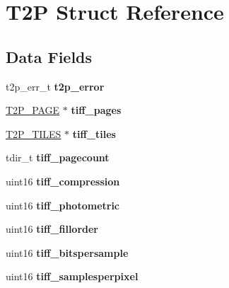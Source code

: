 \hypertarget{struct_t2_p}{}\section{T2\+P Struct Reference}
\label{struct_t2_p}
\subsection*{Data Fields}
\begin{DoxyCompactItemize}
\item 
\hypertarget{struct_t2_p_a9d83353cd1d690dc4c049bda3d47fb19}{}t2p\+\_\+err\+\_\+t {\bfseries t2p\+\_\+error}\label{struct_t2_p_a9d83353cd1d690dc4c049bda3d47fb19}

\item 
\hypertarget{struct_t2_p_adb01b3aa1ab13aca242d6f984a8a8e6f}{}\hyperlink{struct_t2_p___p_a_g_e}{T2\+P\+\_\+\+P\+A\+G\+E} $\ast$ {\bfseries tiff\+\_\+pages}\label{struct_t2_p_adb01b3aa1ab13aca242d6f984a8a8e6f}

\item 
\hypertarget{struct_t2_p_a65ab7f6983402bed8c966d8ff3c77e71}{}\hyperlink{struct_t2_p___t_i_l_e_s}{T2\+P\+\_\+\+T\+I\+L\+E\+S} $\ast$ {\bfseries tiff\+\_\+tiles}\label{struct_t2_p_a65ab7f6983402bed8c966d8ff3c77e71}

\item 
\hypertarget{struct_t2_p_a311407007d308574d74a180f91484d5a}{}tdir\+\_\+t {\bfseries tiff\+\_\+pagecount}\label{struct_t2_p_a311407007d308574d74a180f91484d5a}

\item 
\hypertarget{struct_t2_p_abdc54f06f1a79bf594140348e14c9c1a}{}uint16 {\bfseries tiff\+\_\+compression}\label{struct_t2_p_abdc54f06f1a79bf594140348e14c9c1a}

\item 
\hypertarget{struct_t2_p_a4664b8b7c2f3d58b14a5bc14b573d90f}{}uint16 {\bfseries tiff\+\_\+photometric}\label{struct_t2_p_a4664b8b7c2f3d58b14a5bc14b573d90f}

\item 
\hypertarget{struct_t2_p_a04ae93f33dbb01b53da902554368bc0b}{}uint16 {\bfseries tiff\+\_\+fillorder}\label{struct_t2_p_a04ae93f33dbb01b53da902554368bc0b}

\item 
\hypertarget{struct_t2_p_ad463f84e946180e69b7c3cbd572d4b52}{}uint16 {\bfseries tiff\+\_\+bitspersample}\label{struct_t2_p_ad463f84e946180e69b7c3cbd572d4b52}

\item 
\hypertarget{struct_t2_p_a61d606303657b6f99b7a46dc28d9f87f}{}uint16 {\bfseries tiff\+\_\+samplesperpixel}\label{struct_t2_p_a61d606303657b6f99b7a46dc28d9f87f}


\end{DoxyCompactItemize}

